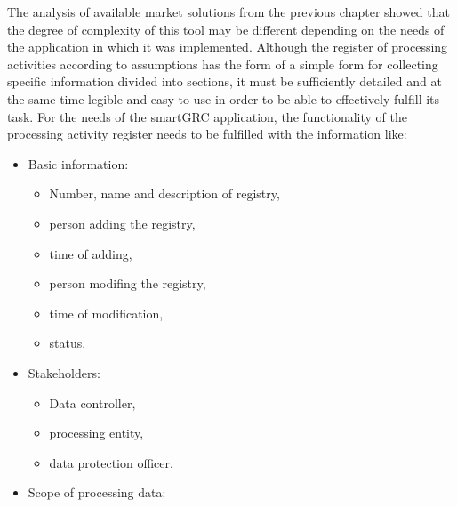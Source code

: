 \documentclass[en, noamssymb]{mgr}
\begin{document}
The analysis of available market solutions from the previous chapter showed that the degree of complexity of this tool may be different depending on the needs of the application in which it was implemented. Although the register of processing activities according to assumptions has the form of a simple form for collecting specific information divided into sections, it must be sufficiently detailed and at the same time legible and easy to use in order to be able to effectively fulfill its task. For the needs of the smartGRC application, the functionality of the processing activity register needs to be fulfilled with the information like:

\begin{itemize}

\item Basic information:

\begin{itemize}

\item Number, name and description of registry,
\item person adding the registry,
\item time of adding,
\item person modifing the registry,
\item time of modification,
\item status.

\end{itemize}

\item Stakeholders:

\begin{itemize}

\item Data controller,
\item processing entity,
\item data protection officer.

\end{itemize}

\item Scope of processing data:

\begin{itemize}


\end{itemize}
\end{itemize}
\end{document}
